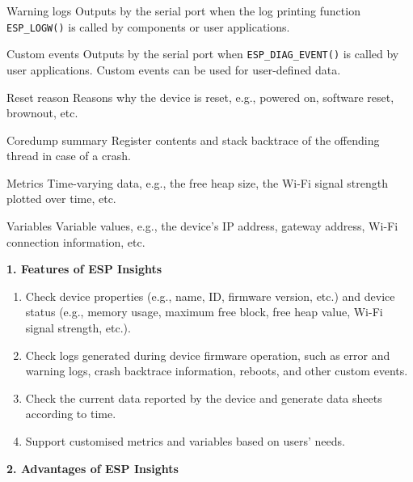 \documentclass[a4paper,12pt]{book}
\begin{document}
\begin{term}{Warning logs}
     Outputs by the serial port when the log printing function \verb|ESP_LOGW()| is called by components or user applications.
\end{term}
     
\begin{term}{Custom events}
     Outputs by the serial port when \verb|ESP_DIAG_EVENT()| is called by user applications. Custom events can be used for user-defined data.
\end{term}

\begin{term}{Reset reason}
     Reasons why the device is reset, e.g., powered on, software reset, brownout, etc.
\end{term}

\begin{term}{Coredump summary}
     Register contents and stack backtrace of the offending thread in case of a crash.
\end{term}
     
\begin{term}{Metrics}
     Time-varying data, e.g., the free heap size, the Wi-Fi signal strength plotted over time, etc.
\end{term}
     
\begin{term}{Variables}
     Variable values, e.g., the device's IP address, gateway address, Wi-Fi connection information, etc.
\end{term}

\textbf{1. Features of ESP Insights}

\begin{enumerate}[label=(\arabic*)]
    \item Check device properties (e.g., name, ID, firmware version, etc.) and device status (e.g., memory usage, maximum free block, free heap value, Wi-Fi signal strength, etc.).
    \item Check logs generated during device firmware operation, such as error and warning logs, crash backtrace information, reboots, and other custom events.
    \item Check the current data reported by the device and generate data sheets according to time.
    \item Support customised metrics and variables based on users' needs.
\end{enumerate}

\textbf{2. Advantages of ESP Insights}
\end{document}
